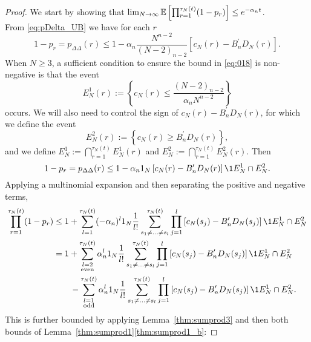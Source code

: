 \begin{proof}
We start by showing that
$\lim_{N\to\infty}\mathbb{E}\left[ \prod_{r=1}^{\tau_N(t)} (1-p_r) \right] 
\leq e^{-\alpha_n t}$.\\
From \eqref{eq:pDelta_UB} we have for each $r$
\begin{equation} \label{eq:018}
1-p_r
= p_{\Delta\Delta}(r) \leq 1 - \alpha_n \frac{N^{n-2}}{(N-2)_{n-2}}
        \left[ c_N(r) - B_n^\prime D_N(r) \right] .
\end{equation}
When $N \geq 3$, a sufficient condition to ensure the bound in \eqref{eq:018} is non-negative is that the event
\begin{equation}\label{eq:defn_E1}
E_N^{1}(r) := \left\{ c_N(r) \leq \frac{(N-2)_{n-2}}{\alpha_n N^{n-2}} \right\} 
\end{equation}
occurs.
We will also need to control the sign of $c_N(r) - B_n^\prime D_N(r)$, for which we define the event
\begin{equation}\label{eq:defn_E2}
E_N^2(r) := \left\{ c_N(r) \geq B_n^\prime D_N(r) \right\} ,
\end{equation}
and we define $E_N^1 := \bigcap_{r=1}^{\tau_N(t)} E_N^1(r)$ and $E_N^2 := \bigcap_{r=1}^{\tau_N(t)} E_N^2(r)$.
Then
\begin{equation*}
1-p_r
= p_{\Delta\Delta}(r) \leq 1 - \alpha_n \ON 
        \left[ c_N(r) - B_n^\prime D_N(r) \right] \1{E_N^1 \cap E_N^2} .
\end{equation*}
Applying a multinomial expansion and then separating the positive and negative terms,
\begin{align}
\prod_{r=1}^{\tau_N(t)} (1-p_r)
&\leq 1 + \sum_{l=1}^{\tau_N(t)} (- \alpha_n)^l \ON 
        \frac{1}{l!} \sum_{s_1\neq\dots\neq s_l}^{\tau_N(t)}\prod_{j=1}^l
        \left[ c_N(s_j) - B_n^\prime D_N(s_j) \right] \1{E_N^1 \cap E_N^2} \notag\\
&= 1 + \sum_{\substack{l=2 \\ \text{even} }}^{\tau_N(t)} 
        \alpha_n^l \ON \frac{1}{l!} 
        \sum_{s_1\neq\dots\neq s_l}^{\tau_N(t)}\prod_{j=1}^l
        \left[ c_N(s_j) - B_n^\prime D_N(s_j) \right] \1{E_N^1 \cap E_N^2} \notag\\
    &\qquad- \sum_{\substack{l=1 \\ \text{odd} }}^{\tau_N(t)} 
        \alpha_n^l \ON \frac{1}{l!} 
        \sum_{s_1\neq\dots\neq s_l}^{\tau_N(t)}\prod_{j=1}^l
        \left[ c_N(s_j) - B_n^\prime D_N(s_j) \right] \1{E_N^1 \cap E_N^2} .
        \label{eq:019}
\end{align}
This is further bounded by applying Lemma~\ref{thm:sumprod3} and then both bounds of Lemma~\ref{thm:sumprod1}\ref{thm:sumprod1_b}:

\end{proof}
